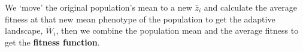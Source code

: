 \documentclass[varwidth]{standalone}
\begin{document}
\begin{minipage}{3in}
We `move' the original population's mean to a new $\bar z_i$ 
and calculate the average fitness at that new mean phenotype 
of the population to get the adaptive landscape, $\bar W_i$, 
then we combine the population mean and the average fitness 
to get the \textcolor{Rred}{\bf fitness function}.
\end{minipage}
\end{document}
